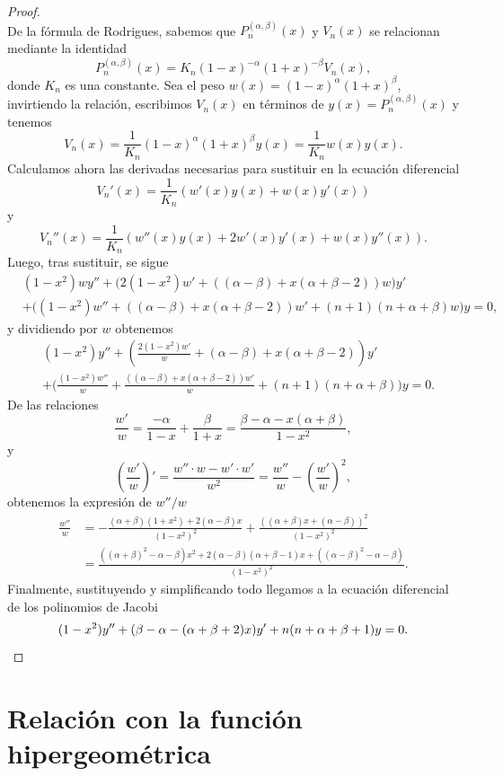 \documentclass[12pt,a4paper]{book}
\begin{document}
\begin{proof}
\[\]
De la fórmula de Rodrigues, sabemos que $P_n^{(\alpha, \beta)}(x)$ y $V_n(x)$ se relacionan mediante la identidad
\[
P_n^{(\alpha, \beta)}(x) = K_n (1-x)^{-\alpha} (1+x)^{-\beta} V_n(x),
\]
donde $K_n$ es una constante. Sea el peso $w(x) = (1-x)^{\alpha} (1+x)^{\beta}$, invirtiendo la relación, escribimos $V_n(x)$ en términos de $y(x) = P_n^{(\alpha, \beta)}(x)$ y tenemos
\[
V_n(x) = \frac{1}{K_n} (1-x)^{\alpha} (1+x)^{\beta} y(x) = \frac{1}{K_n}w(x)y(x).
\]
Calculamos ahora las derivadas necesarias para sustituir en la ecuación diferencial
\[
V_n'(x) =\frac{1}{K_n} (w'(x)y(x) + w(x)y'(x))
\]
y
\[
V_n''(x) =\frac{1}{K_n} (w''(x)y(x) + 2w'(x)y'(x) + w(x)y''(x)).
\]
Luego, tras sustituir, se sigue
\begin{align*}
    &(1-x^2)wy'' + \big( 2(1-x^2)w' + ((\alpha - \beta) + x(\alpha + \beta - 2))w \big)y' \\
    &+ \big( (1-x^2)w'' + ((\alpha - \beta) + x(\alpha + \beta - 2))w' + (n+1)(n + \alpha + \beta)w \big)y = 0, 
\end{align*}
y dividiendo por $w$ obtenemos
\begin{align*}
    &(1-x^2)y'' + \left( \frac{2(1-x^2)w'}{w} + (\alpha - \beta) + x(\alpha + \beta - 2) \right)y' \\
    &+ \bigg( \frac{(1-x^2)w''}{w} + \frac{((\alpha - \beta) + x(\alpha + \beta - 2))w'}{w} + (n+1)(n + \alpha + \beta) \bigg)y = 0.
\end{align*}
De las relaciones
\[
\frac{w'}{w} = \frac{-\alpha}{1-x} + \frac{\beta}{1+x} = \frac{\beta - \alpha - x(\alpha+\beta)}{1-x^2},
\]
y
\[
\left(\frac{w'}{w}\right)' = \frac{w'' \cdot w - w' \cdot w'}{w^2} = \frac{w''}{w} - \left(\frac{w'}{w}\right)^2,
\]
obtenemos la expresión de $w''/w$
\begin{align*}
    \frac{w''}{w} &= -\frac{(\alpha+\beta)(1+x^2) + 2(\alpha-\beta)x}{(1-x^2)^2} + \frac{((\alpha+\beta)x + (\alpha-\beta) )^2}{(1-x^2)^2} \\ 
    &= \frac{((\alpha+\beta)^2 - \alpha-\beta)x^2 + 2(\alpha-\beta)(\alpha+\beta-1)x + ((\alpha-\beta)^2 - \alpha-\beta)}{(1-x^2)^2}.
\end{align*}
Finalmente, sustituyendo y simplificando todo llegamos a la ecuación diferencial de los polinomios de Jacobi
\[
     (1-x^2)y'' + (\beta - \alpha - (\alpha + \beta + 2)x)y' + n(n + \alpha + \beta + 1)y = 0.
     \qedhere
\]
\end{proof}

\section{Relación con la función hipergeométrica}
\label{sec:relacion_hipergeometrica}
\end{document}
